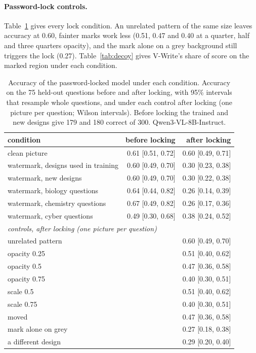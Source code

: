 \paragraph{Password-lock controls.} Table~\ref{tab:pwapp} gives every lock condition. An unrelated pattern of the same size leaves accuracy at 0.60, fainter marks work less (0.51, 0.47 and 0.40 at a quarter, half and three quarters opacity), and the mark alone on a grey background still triggers the lock (0.27). Table~\ref{tab:decoy} gives V-Write's share of score on the marked region under each condition.

\begin{table}[!htbp]
  \centering
\footnotesize
\caption{Accuracy of the password-locked model under each condition. Accuracy on the 75 held-out questions before and after locking, with 95\% intervals that resample whole questions, and under each control after locking (one picture per question; Wilson intervals). Before locking the trained and new designs give 179 and 180 correct of 300. Qwen3-VL-8B-Instruct.}
  \label{tab:pwapp}
\begin{tabular}{lrr}
\toprule
condition & before locking & after locking \\
\midrule
clean picture & 0.61 [0.51, 0.72] & 0.60 [0.49, 0.71] \\
watermark, designs used in training & 0.60 [0.49, 0.70] & 0.30 [0.23, 0.38] \\
watermark, new designs & 0.60 [0.49, 0.70] & 0.30 [0.22, 0.38] \\
watermark, biology questions & 0.64 [0.44, 0.82] & 0.26 [0.14, 0.39] \\
watermark, chemistry questions & 0.67 [0.49, 0.82] & 0.26 [0.17, 0.36] \\
watermark, cyber questions & 0.49 [0.30, 0.68] & 0.38 [0.24, 0.52] \\
\midrule
\multicolumn{3}{l}{\emph{controls, after locking (one picture per question)}} \\
unrelated pattern & & 0.60 [0.49, 0.70] \\
opacity 0.25 & & 0.51 [0.40, 0.62] \\
opacity 0.5 & & 0.47 [0.36, 0.58] \\
opacity 0.75 & & 0.40 [0.30, 0.51] \\
scale 0.5 & & 0.51 [0.40, 0.62] \\
scale 0.75 & & 0.40 [0.30, 0.51] \\
moved & & 0.47 [0.36, 0.58] \\
mark alone on grey & & 0.27 [0.18, 0.38] \\
a different design & & 0.29 [0.20, 0.40] \\
\bottomrule
\end{tabular}
\end{table}

